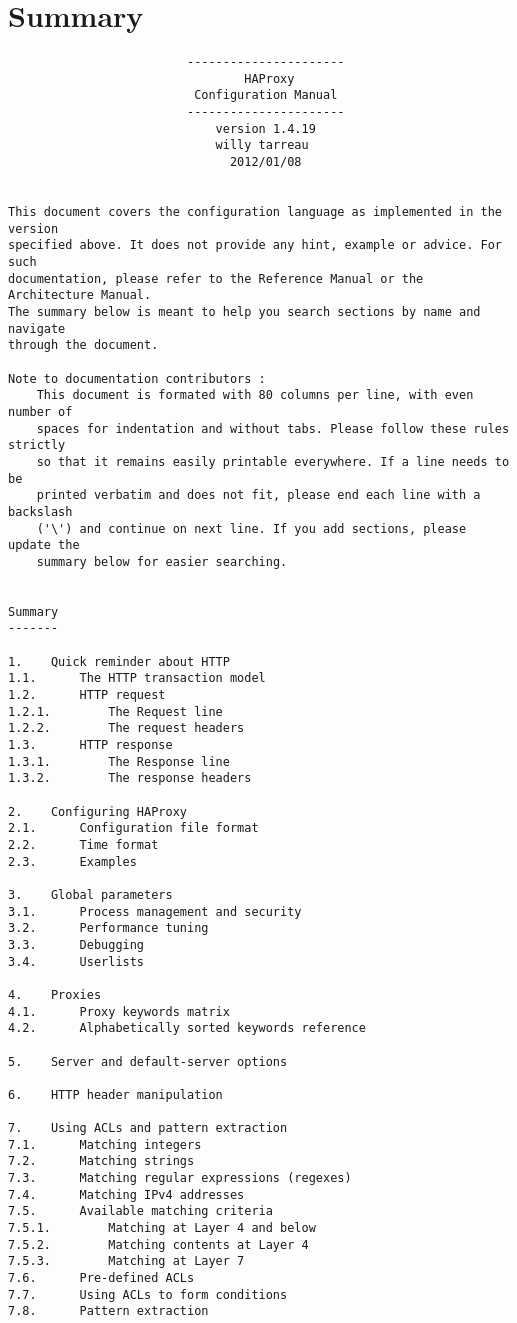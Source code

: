 
\chapter*{Summary}

\begin{verbatim}
                         ----------------------
                                 HAProxy
                          Configuration Manual
                         ----------------------
                             version 1.4.19
                             willy tarreau
                               2012/01/08


This document covers the configuration language as implemented in the version
specified above. It does not provide any hint, example or advice. For such
documentation, please refer to the Reference Manual or the Architecture Manual.
The summary below is meant to help you search sections by name and navigate
through the document.

Note to documentation contributors :
    This document is formated with 80 columns per line, with even number of
    spaces for indentation and without tabs. Please follow these rules strictly
    so that it remains easily printable everywhere. If a line needs to be
    printed verbatim and does not fit, please end each line with a backslash
    ('\') and continue on next line. If you add sections, please update the
    summary below for easier searching.


Summary
-------

1.    Quick reminder about HTTP
1.1.      The HTTP transaction model
1.2.      HTTP request
1.2.1.        The Request line
1.2.2.        The request headers
1.3.      HTTP response
1.3.1.        The Response line
1.3.2.        The response headers

2.    Configuring HAProxy
2.1.      Configuration file format
2.2.      Time format
2.3.      Examples

3.    Global parameters
3.1.      Process management and security
3.2.      Performance tuning
3.3.      Debugging
3.4.      Userlists

4.    Proxies
4.1.      Proxy keywords matrix
4.2.      Alphabetically sorted keywords reference

5.    Server and default-server options

6.    HTTP header manipulation

7.    Using ACLs and pattern extraction
7.1.      Matching integers
7.2.      Matching strings
7.3.      Matching regular expressions (regexes)
7.4.      Matching IPv4 addresses
7.5.      Available matching criteria
7.5.1.        Matching at Layer 4 and below
7.5.2.        Matching contents at Layer 4
7.5.3.        Matching at Layer 7
7.6.      Pre-defined ACLs
7.7.      Using ACLs to form conditions
7.8.      Pattern extraction


\end{verbatim}
